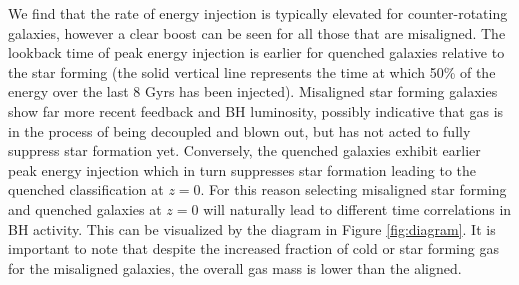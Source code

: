 \documentclass[fleqn,usenatbib]{mnras}
\begin{document}
We find that the rate of energy injection is typically elevated for counter-rotating galaxies, however a clear boost can be seen for all those that are misaligned. The lookback time of peak energy injection is earlier for quenched galaxies relative to the star forming (the solid vertical line represents the time at which 50\% of the energy over the last 8 Gyrs has been injected). Misaligned star forming galaxies show far more recent feedback and BH luminosity, possibly indicative that gas is in the process of being decoupled and blown out, but has not acted to fully suppress star formation yet. Conversely, the quenched galaxies exhibit earlier peak energy injection which in turn suppresses star formation leading to the quenched classification at $z=0$. For this reason selecting misaligned star forming and quenched galaxies at $z=0$ will naturally lead to different time correlations in BH activity. This can be visualized by the diagram in Figure \ref{fig:diagram}. It is important to note that despite the increased fraction of cold or star forming gas for the misaligned galaxies, the overall gas mass is lower than the aligned.

\end{document}
